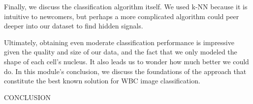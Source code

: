 \begin{qbox}\end{qbox}

Finally, we discuss the classification algorithm itself. We used k-NN because it is intuitive to newcomers, but perhaps a more complicated algorithm could peer deeper into our dataset to find hidden signals.

Ultimately, obtaining even moderate classification performance is impressive given the quality and size of our data, and the fact that we only modeled the shape of each cell's nucleus. It also leads us to wonder how much better we could do. In this module's conclusion, we discuss the foundations of the approach that constitute the best known solution for WBC image classification.

CONCLUSION
